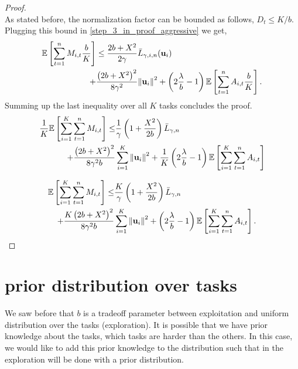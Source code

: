 \begin{proof}
\begin{equation}
\end{equation}
As stated before, the normalization factor can be bounded as
follows,
$D_{t}\le K/b$.
Plugging this bound in \eqref{step_3_in_proof_aggressive} we get,
\begin{equation}\label{eq:bound_for_i_aggressive}
\begin{split}
\mathbb{E}\left[{\sum_{t=1}^{n}{M_{i,t}\frac{b}{K}}}\right]
&\le \frac{2b+X^2}{2\gamma}{\bar L}_{\gamma,i,n}(\mathbf{u}_{i})\\
+&\frac{\left({2b+X^2}\right)^2}{8{\gamma}^2}{\left\Vert \mathbf{u}_{i} \right\Vert}^2+ \left({2\frac{\lambda}{b}-1}\right)\mathbb{E}\left[{\sum_{t=1}^{n}{A_{i,t}\frac{b}{K}}}\right].
\end{split}
\end{equation}
Summing up the last inequality over all $K$ tasks concludes the proof.
\begin{equation*}
\begin{split}
\frac{1}{K}\mathbb{E}\left[ \sum_{i=1}^{K}\sum_{t=1}^{n}{M_{i,t}} \right]
\le&\frac{1}{\gamma}\left(1+\frac{X^2}{2b} \right){\bar L}_{\gamma,n}\\
+\frac{\left({2b+X^2}\right)^2}{8{\gamma}^2b}&\sum_{i=1}^{K}{{\left\Vert \mathbf{u}_{i} \right\Vert}^2}+ \frac{1}{K}\left({2\frac{\lambda}{b}-1}\right)\mathbb{E}\left[{\sum_{i=1}^{K}\sum_{t=1}^{n}{A_{i,t}}}\right]
\end{split}
\end{equation*}

\begin{equation}
\begin{split}
\mathbb{E}\left[ \sum_{i=1}^{K}\sum_{t=1}^{n}{M_{i,t}} \right]
\le&\frac{K}{\gamma}\left(1+\frac{X^2}{2b} \right){\bar L}_{\gamma,n}\\
+\frac{K\left({2b+X^2}\right)^2}{8{\gamma}^2b}&\sum_{i=1}^{K}{{\left\Vert \mathbf{u}_{i} \right\Vert}^2}+\left({2\frac{\lambda}{b}-1}\right)\mathbb{E}\left[{\sum_{i=1}^{K}\sum_{t=1}^{n}{A_{i,t}}}\right].
\end{split}
\label{final_eq}
\end{equation}
\QED
\end{proof}

\section{prior distribution over tasks}

We saw before that $b$ is a tradeoff parameter between  exploitation and uniform  distribution over the tasks (exploration). It is possible that we have prior knowledge about the tasks, which tasks are harder than the others. In this case, we would like to add this prior knowledge to the distribution such that in the exploration will be done with  a prior distribution.       

